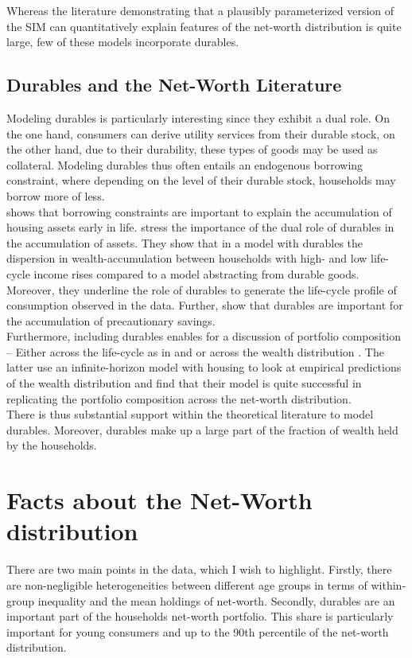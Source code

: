 \documentclass[a4paper,12pt,legno]{article}
\begin{document}
Whereas the literature demonstrating that a plausibly parameterized version of the SIM can quantitatively explain features of the net-worth distribution is quite large, few of these models incorporate durables.

\subsection{Durables and the Net-Worth Literature}

Modeling durables is particularly interesting since they exhibit a dual role. On the one hand, consumers can derive utility services from their durable stock, on the other hand, due to their durability, these types of goods may be used as collateral. Modeling durables thus often entails an endogenous borrowing constraint, where depending on the level of their durable stock, households may borrow more of less. \\
\cite{yang2009} shows that borrowing constraints are important to explain the accumulation of housing assets early in life. \cite{FV&K2011} stress the importance of the dual role of durables in the accumulation of assets. They show that in a model with durables the dispersion in wealth-accumulation between households with high- and low life-cycle income rises compared to a model abstracting from durable goods. Moreover, they underline the role of durables to generate the life-cycle profile of consumption observed in the data. Further, \cite{gruber2003precautionary} show that durables are important for the accumulation of precautionary savings.    
\\
Furthermore, including durables enables for a discussion of portfolio composition \--- Either across the life-cycle as in \cite{yang2009} and \cite{FV&K2011} or across the wealth distribution \citep{diaz2010}. The latter use an infinite-horizon model with housing to look at empirical predictions of the wealth distribution and find that their model is quite successful in replicating the portfolio composition across the net-worth distribution.
\\
There is thus substantial support within the theoretical literature to model durables. Moreover, durables make up a large part of the fraction of wealth held by the households. 

\section{Facts about the Net-Worth distribution } \label{facts} There are two main points in the data, which I wish to highlight. Firstly, there are non-negligible heterogeneities between different age groups in terms of within-group inequality and the mean holdings of net-worth. Secondly, durables are an important part of the households net-worth portfolio. This share is particularly important for young consumers and up to the 90th percentile of the net-worth distribution. 
\end{document}
